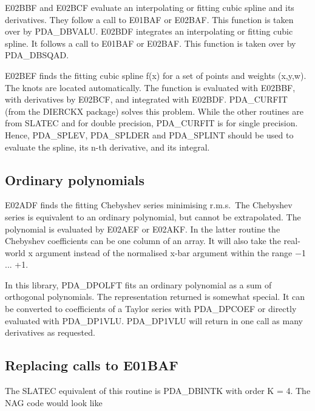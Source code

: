 \documentclass[11pt,twoside]{article}
\newcommand{\htmlref}[2]{#1}
\newcommand{\xlabel}[1]{}
\begin{document}
   E02BBF and E02BCF evaluate an interpolating or fitting cubic spline
   and its derivatives. They follow a call to E01BAF or E02BAF.
   This function is taken over by PDA\_DBVALU.
   E02BDF integrates an interpolating or fitting cubic spline. It
   follows a call to E01BAF or E02BAF. This function is taken over by
   PDA\_DBSQAD.

   E02BEF finds the fitting cubic spline f(x) for a set of points and
   weights (x,y,w). The knots are located automatically. The function is
   evaluated with E02BBF, with derivatives by E02BCF, and integrated
   with E02BDF. PDA\_CURFIT (from the DIERCKX package) solves this problem.
   While the other routines are from SLATEC and for double precision,
   PDA\_CURFIT is for single precision. Hence, PDA\_SPLEV, PDA\_SPLDER
   and PDA\_SPLINT should be used to evaluate the spline, its n-th derivative,
   and its integral.


\subsection{\xlabel{ordinary_polynomials}Ordinary polynomials}

   E02ADF finds the fitting Chebyshev series minimising r.m.s.\ The
   Chebyshev series is equivalent to an ordinary polynomial, but cannot
   be extrapolated. The
   polynomial is evaluated by E02AEF or E02AKF. In the latter
   routine the Chebyshev coefficients can be one column of an array.
   It will also take the real-world x argument instead of the normalised
   x-bar argument within the range $-$1 ... +1.

   In this library, PDA\_DPOLFT fits an ordinary polynomial as a sum of
   orthogonal polynomials. The representation returned is somewhat
   special. It can be converted to coefficients of a Taylor series with
   PDA\_DPCOEF or directly evaluated with PDA\_DP1VLU. PDA\_DP1VLU will
   return in one call as many derivatives as requested.


\subsection{\xlabel{replacing_calls_to_e01baf}\label{m_e01baf}Replacing calls to E01BAF}

   The SLATEC equivalent of this routine is
\htmlref{PDA\_DBINTK}{PDA\_DBINTK}
   with order K = 4. The NAG code would look like
\end{document}
